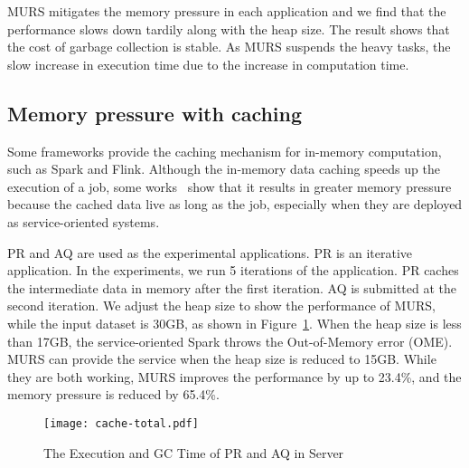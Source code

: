 MURS mitigates the memory pressure in each application and we find that the performance slows down tardily along with the heap size. The result shows that the cost of garbage collection is stable. As MURS suspends the heavy tasks, the slow increase in execution time due to the increase in computation time.  

\begin{comment}
\begin{figure}[!t]
\centering
\texttt{[image: active-task.pdf]}
\caption{The minimum active tasks in each server}
\label{fig:active-task}
\end{figure}
\end{comment}

\subsection{Memory pressure with caching}

Some frameworks provide the caching mechanism for in-memory computation, such as Spark and Flink. Although the in-memory data caching speeds up the execution of a job, some works~\cite{bu:bloat, nguyen2015facade} show that it results in greater memory pressure because the cached data live as long as the job, especially when they are deployed as service-oriented systems. 

PR and AQ are used as the experimental applications. PR is an iterative application. In the experiments, we run 5 iterations of the application. PR caches the intermediate data in memory after the first iteration. AQ is submitted at the second iteration. 
We adjust the heap size to show the performance of MURS, while the input dataset is 30GB, as shown in Figure~\ref{fig:cache-total}. When the heap size is less than 17GB, the service-oriented Spark throws the Out-of-Memory error (OME). MURS can provide the service when the heap size is reduced to 15GB. While they are both working, MURS improves the performance by up to 23.4\%, and the memory pressure is reduced by 65.4\%.

\begin{figure}[!t]
\centering
\texttt{[image: cache-total.pdf]}
\vspace{-2mm}
\caption{The Execution and GC Time of PR and AQ in Server}
\vspace{-2mm}
\label{fig:cache-total}
\end{figure}

